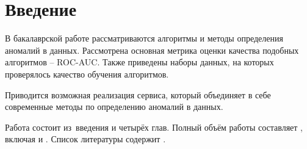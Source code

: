 \chapter*{Введение}                         %

В бакалаврской работе рассматриваются алгоритмы и методы определения аномалий в данных. Рассмотрена основная метрика оценки качества подобных алгоритмов -- ROC-AUC. Также приведены наборы данных, на которых проверялось качество обучения алгоритмов.

Приводится возможная реализация сервиса, который объединяет в себе современные методы по определению аномалий в данных.

Работа состоит из~введения и четырёх глав.
Полный объём работы составляет
, включая
 и
.   Список литературы содержит
.

